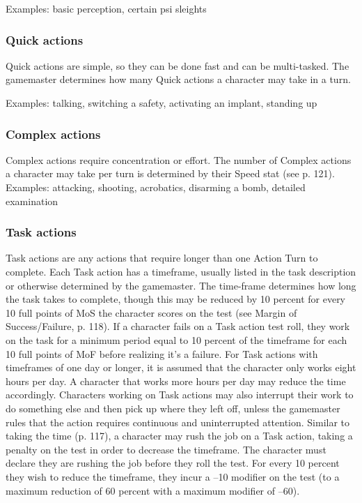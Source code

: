 Examples: basic perception, certain psi sleights

\subsubsection{Quick actions}
\label{sec:quick-actions}

Quick actions are simple, so they can be done fast and can be multi-tasked. The gamemaster determines how many Quick actions a character may take in a turn.

Examples: talking, switching a safety, activating an implant, standing up

\subsubsection{Complex actions}
\label{sec:complex-actions}

Complex actions require concentration or effort. The number of Complex actions a character may take per turn is determined by their Speed stat (see p. 121). Examples: attacking, shooting, acrobatics, disarming a bomb, detailed examination

\subsubsection{Task actions}
\label{sec:task-actions}

Task actions are any actions that require longer than one Action Turn to complete. Each Task action has a timeframe, usually listed in the task description or otherwise determined by the gamemaster. The time-frame determines how long the task takes to complete, though this may be reduced by 10 percent for every 10 full points of MoS the character scores on the test (see Margin of Success/Failure, p. 118). If a character fails on a Task action test roll, they work on the task for a minimum period equal to 10 percent of the timeframe for each 10 full points of MoF before realizing it's a failure. For Task actions with timeframes of one day or longer, it is assumed that the character only works eight hours per day. A character that works more hours per day may reduce the time accordingly. Characters working on Task actions may also interrupt their work to do something else and then pick up where they left off, unless the gamemaster rules that the action requires continuous and uninterrupted attention. Similar to taking the time (p. 117), a character may rush the job on a Task action, taking a penalty on the test in order to decrease the timeframe. The character must declare they are rushing the job before they roll the test. For every 10 percent they wish to reduce the timeframe, they incur a –10 modifier on the test (to a maximum reduction of 60 percent with a maximum modifier of –60).

